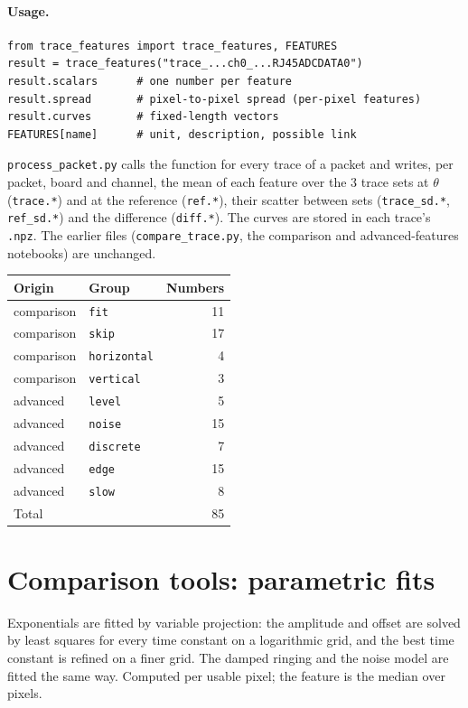 \documentclass[10pt]{article}
\newcommand{\code}[1]{\texttt{#1}}
\begin{document}
\paragraph{Usage.}
\begin{verbatim}
from trace_features import trace_features, FEATURES
result = trace_features("trace_...ch0_...RJ45ADCDATA0")
result.scalars      # one number per feature
result.spread       # pixel-to-pixel spread (per-pixel features)
result.curves       # fixed-length vectors
FEATURES[name]      # unit, description, possible link
\end{verbatim}
\code{process\_packet.py} calls the function for every trace of a packet and writes, per packet, board and channel, the mean
of each feature over the 3 trace sets at $\theta$ (\code{trace.*}) and at the reference (\code{ref.*}), their scatter between sets
(\code{trace\_sd.*}, \code{ref\_sd.*}) and the difference (\code{diff.*}). The curves are stored in each trace's \code{.npz}.
The earlier files (\code{compare\_trace.py}, the comparison and advanced-features notebooks) are unchanged.

\begin{center}
\begin{tabular}{llr}
\toprule
Origin & Group & Numbers \\
\midrule
comparison & \code{fit} & 11 \\
comparison & \code{skip} & 17 \\
comparison & \code{horizontal} & 4 \\
comparison & \code{vertical} & 3 \\
advanced & \code{level} & 5 \\
advanced & \code{noise} & 15 \\
advanced & \code{discrete} & 7 \\
advanced & \code{edge} & 15 \\
advanced & \code{slow} & 8 \\
\midrule
Total & & 85 \\
\bottomrule
\end{tabular}
\end{center}

\section{Comparison tools: parametric fits}
Exponentials are fitted by variable projection: the amplitude and offset are solved by least squares for every time constant on a logarithmic grid, and the best time constant is refined on a finer grid. The damped ringing and the noise model are fitted the same way. Computed per usable pixel; the feature is the median over pixels.
\end{document}
